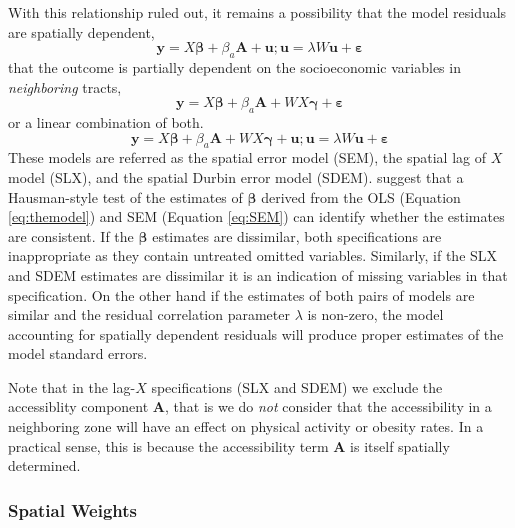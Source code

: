 \documentclass[shortAfour,sageh.bst]{sagej}
\begin{document}
With this relationship ruled out, it remains a possibility that the
model residuals are spatially dependent, \begin{equation}\label{eq:SEM}
 \boldsymbol{y} = X\boldsymbol{\beta} + \beta_a \boldsymbol{A} + \boldsymbol{u}; \boldsymbol{u} = \lambda W \boldsymbol{u} + \boldsymbol{\varepsilon}
\end{equation} that the outcome is partially dependent on the
socioeconomic variables in \emph{neighboring} tracts,
\begin{equation}\label{eq:SLX}
 \boldsymbol{y} = X\boldsymbol{\beta} + \beta_a \boldsymbol{A} + W X \boldsymbol{\gamma} + \boldsymbol{\varepsilon}
\end{equation} or a linear combination of both.
\begin{equation}\label{eq:SDEM}
 \boldsymbol{y} = X\boldsymbol{\beta} + \beta_a \boldsymbol{A} + W X \boldsymbol{\gamma} + \boldsymbol{u}; \boldsymbol{u} = \lambda W \boldsymbol{u} + \boldsymbol{\varepsilon}
\end{equation} These models are referred as the spatial error model
(SEM), the spatial lag of \(X\) model (SLX), and the spatial Durbin
error model (SDEM). \citet{Pace2008} suggest that a Hausman-style test
of the estimates of \(\boldsymbol{\beta}\) derived from the OLS
(Equation \ref{eq:themodel}) and SEM (Equation \ref{eq:SEM}) can
identify whether the estimates are consistent. If the
\(\boldsymbol{\beta}\) estimates are dissimilar, both specifications are
inappropriate as they contain untreated omitted variables. Similarly, if
the SLX and SDEM estimates are dissimilar it is an indication of missing
variables in that specification. On the other hand if the estimates of
both pairs of models are similar and the residual correlation parameter
\(\lambda\) is non-zero, the model accounting for spatially dependent
residuals will produce proper estimates of the model standard errors.

Note that in the lag-\(X\) specifications (SLX and SDEM) we exclude the
accessiblity component \(\boldsymbol{A}\), that is we do \emph{not}
consider that the accessibility in a neighboring zone will have an
effect on physical activity or obesity rates. In a practical sense, this
is because the accessibility term \(\boldsymbol{A}\) is itself spatially
determined.

\hypertarget{spatial-weights}{%
\subsubsection{Spatial Weights}\label{spatial-weights}}
\end{document}
